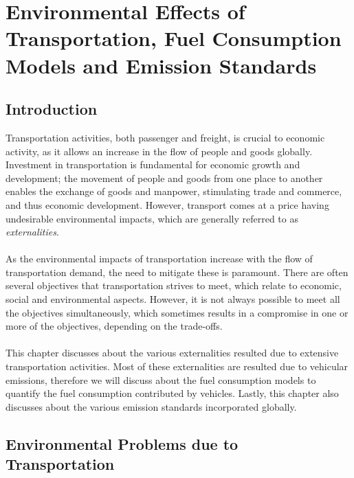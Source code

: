 \chapter{Environmental Effects of Transportation, Fuel Consumption Models and Emission Standards}
\section{Introduction}
Transportation activities, both passenger and freight, is crucial to economic activity, as it allows an increase in the flow of people and goods globally. Investment in transportation is fundamental for economic growth and development; the movement of people and goods from one place to another enables the exchange of goods and manpower, stimulating trade and commerce, and thus economic development. However, transport comes at a price having undesirable environmental impacts, which are generally referred to as \textit{externalities}.\\\\
As the environmental impacts of transportation increase with the flow
of transportation demand, the need to mitigate these is paramount. There are often several objectives that transportation strives to meet, which relate to economic, social and environmental aspects. However, it is not always possible to meet all the objectives simultaneously, which sometimes results in a compromise in one or more of the objectives, depending on the trade-offs.\\\\
This chapter discusses about the various externalities resulted due to extensive transportation activities. Most of these externalities are resulted due to vehicular emissions, therefore we will discuss about the fuel consumption models to quantify the fuel consumption contributed by vehicles. Lastly, this chapter also discusses about the various emission standards incorporated globally.
%
\section{Environmental Problems due to Transportation}
